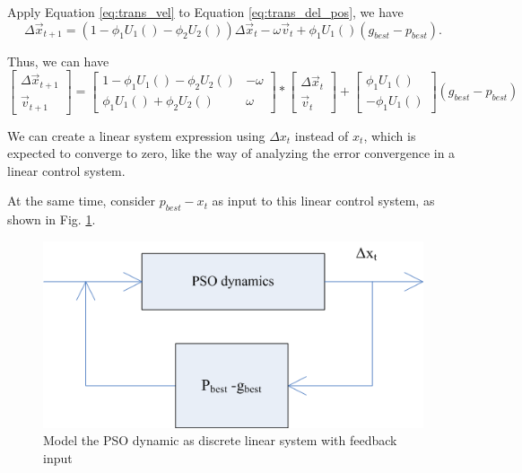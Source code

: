 \documentclass[12pt]{article}
\begin{document}
\begin{enumerate}
Apply Equation \eqref{eq:trans_vel} to Equation \eqref{eq:trans_del_pos}, we have
\begin{equation}
\label{eq:trans_del_pos2}
\Delta \vec{x}_{t+1} = (1 - \phi_{1} U_{1}() - \phi_{2} U_{2}()) \Delta \vec{x}_{t} - \omega \vec{v}_{t} + \phi_{1} U_{1}() (g_{best} - p_{best}).
\end{equation}

Thus, we can have
\begin{equation}
\label{eq:linear_sys}
\begin{bmatrix}
\Delta \vec{x}_{t+1}
\\
\vec{v}_{t+1}
\end{bmatrix}
 = 
\begin{bmatrix}
1 - \phi_{1} U_{1}() - \phi_{2} U_{2}() &  - \omega
\\
\phi_{1} U_{1}() + \phi_{2} U_{2}() & \omega
\end{bmatrix}
*
\begin{bmatrix}
\Delta \vec{x}_{t}
\\
\vec{v}_{t}
\end{bmatrix}
+
\begin{bmatrix}
\phi_{1} U_{1}()
\\
- \phi_{1} U_{1}()
\end{bmatrix}
(g_{best} - p_{best})
\end{equation}


We can create a linear system expression using $ \Delta x_{t} $ instead of $ x_{t} $, which is expected to converge to zero, like the way of analyzing the error convergence in a linear control system.

At the same time, consider $ p_{best} - x_{t} $ as input to this linear control system, as shown in Fig. \ref{fig:system}. 

\begin{figure}
\centering
\includegraphics[width=0.7\linewidth]{./system}
\caption{Model the PSO dynamic as discrete linear system with feedback input}
\label{fig:system}
\end{figure}


\end{enumerate}
\end{document}
